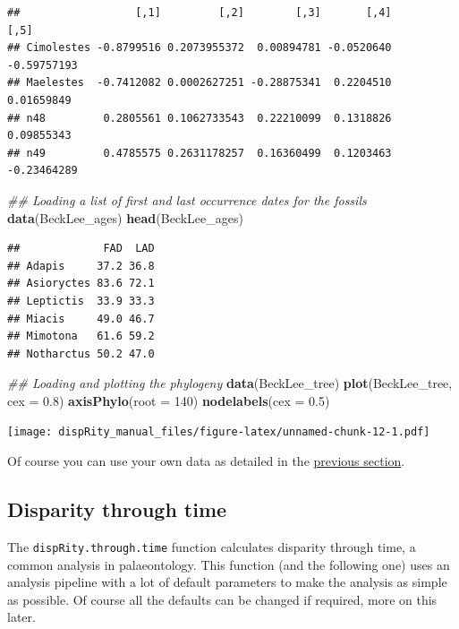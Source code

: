 \documentclass[]{book}
\newenvironment{Shaded}{\begin{snugshade}}{\end{snugshade}}
\newcommand{\CommentTok}[1]{\textcolor[rgb]{0.56,0.35,0.01}{\textit{#1}}}
\newcommand{\DataTypeTok}[1]{\textcolor[rgb]{0.13,0.29,0.53}{#1}}
\newcommand{\DecValTok}[1]{\textcolor[rgb]{0.00,0.00,0.81}{#1}}
\newcommand{\FloatTok}[1]{\textcolor[rgb]{0.00,0.00,0.81}{#1}}
\newcommand{\KeywordTok}[1]{\textcolor[rgb]{0.13,0.29,0.53}{\textbf{#1}}}
\newcommand{\NormalTok}[1]{#1}
\begin{document}
\begin{verbatim}
##                  [,1]         [,2]        [,3]       [,4]        [,5]
## Cimolestes -0.8799516 0.2073955372  0.00894781 -0.0520640 -0.59757193
## Maelestes  -0.7412082 0.0002627251 -0.28875341  0.2204510  0.01659849
## n48         0.2805561 0.1062733543  0.22210099  0.1318826  0.09855343
## n49         0.4785575 0.2631178257  0.16360499  0.1203463 -0.23464289
\end{verbatim}

\begin{Shaded}
\begin{Highlighting}[]
\CommentTok{## Loading a list of first and last occurrence dates for the fossils}
\KeywordTok{data}\NormalTok{(BeckLee_ages)}
\KeywordTok{head}\NormalTok{(BeckLee_ages)}
\end{Highlighting}
\end{Shaded}

\begin{verbatim}
##             FAD  LAD
## Adapis     37.2 36.8
## Asioryctes 83.6 72.1
## Leptictis  33.9 33.3
## Miacis     49.0 46.7
## Mimotona   61.6 59.2
## Notharctus 50.2 47.0
\end{verbatim}

\begin{Shaded}
\begin{Highlighting}[]
\CommentTok{## Loading and plotting the phylogeny}
\KeywordTok{data}\NormalTok{(BeckLee_tree)}
\KeywordTok{plot}\NormalTok{(BeckLee_tree, }\DataTypeTok{cex =} \FloatTok{0.8}\NormalTok{) }
\KeywordTok{axisPhylo}\NormalTok{(}\DataTypeTok{root =} \DecValTok{140}\NormalTok{)}
\KeywordTok{nodelabels}\NormalTok{(}\DataTypeTok{cex =} \FloatTok{0.5}\NormalTok{)}
\end{Highlighting}
\end{Shaded}

\texttt{[image: dispRity\_manual\_files/figure-latex/unnamed-chunk-12-1.pdf]}

Of course you can use your own data as detailed in the \protect\hyperlink{What-sort-of-data-does-dispRity-work-with}{previous section}.

\hypertarget{disparity-through-time}{%
\subsection{Disparity through time}\label{disparity-through-time}}

The \texttt{dispRity.through.time} function calculates disparity through time, a common analysis in palaeontology.
This function (and the following one) uses an analysis pipeline with a lot of default parameters to make the analysis as simple as possible.
Of course all the defaults can be changed if required, more on this later.
\end{document}
